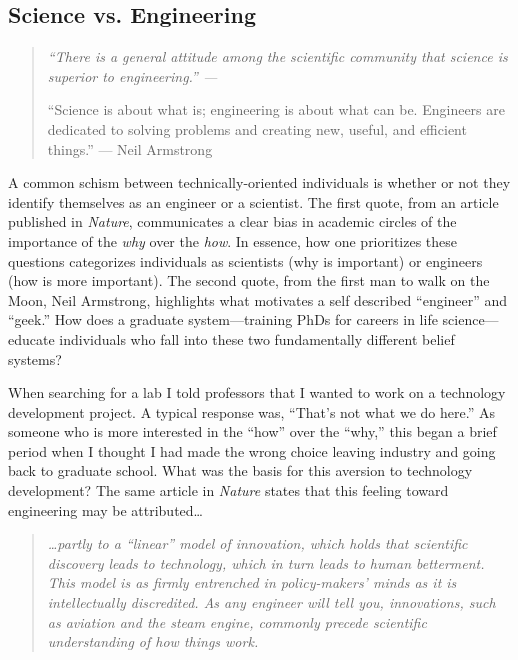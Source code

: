   \subsection{Science vs. Engineering}
    \label{Disc:subsec:Science and Engineering}

    \begin{quote}
      \itshape 
      \singlespacing
      ``There is a general attitude among the scientific community that science is superior to engineering.'' --- \citep{Macilwain2010}

      ``Science is about what is; engineering is about what can be. Engineers are dedicated to solving problems and creating new, useful, and efficient things.'' --- Neil Armstrong
      \end{quote}

    A common schism between technically-oriented individuals is whether or not they identify themselves as an engineer or a scientist. The first quote, from an article published in \textit{Nature}, communicates a clear bias in academic circles of the importance of the \textit{why} over the \textit{how}. In essence, how one prioritizes these questions categorizes individuals as scientists (why is important) or engineers (how is more important). The second quote, from the first man to walk on the Moon, Neil Armstrong, highlights what motivates a self described ``engineer'' and ``geek.'' How does a graduate system---training PhDs for careers in life science---educate individuals who fall into these two fundamentally different belief systems?

    When searching for a lab I told professors that I wanted to work on a technology development project. A typical response was, ``That's not what we do here.'' As someone who is more interested in the ``how'' over the ``why,'' this began a brief period when I thought I had made the wrong choice leaving industry and going back to graduate school. What was the basis for this aversion to technology development? The same article in \textit{Nature} states that this feeling toward engineering may be attributed\ldots

    \begin{quote} 
      \itshape 
      \singlespacing
      \ldots partly to a ``linear'' model of innovation, which holds that scientific discovery leads to technology, which in turn leads to human betterment. This model is as firmly entrenched in policy-makers' minds as it is intellectually discredited. As any engineer will tell you, innovations, such as aviation and the steam engine, commonly precede scientific understanding of how things work.
      \end{quote} 

